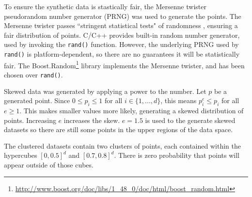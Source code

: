 To ensure the synthetic data is stastically fair, the Mersenne twister pseudorandom number generator (PRNG) was used to generate the points.  The Mersenne twister passes ``stringent statistical tests" of randomness \cite{mersenne-twister}, ensuring a fair distribution of points. C/C++ provides built-in random number generator, used by invoking the \texttt{rand()} function. However, the underlying PRNG used by \texttt{rand()} is platform-dependent, so there are no guarantees it will be statistically fair. The Boost.Random\footnote{\url{http://www.boost.org/doc/libs/1_48_0/doc/html/boost_random.html}} library implements the Mersenne twister, and has been chosen over \texttt{rand()}. 



Skewed data was generated by applying a power to the number. Let $p$ be a generated point. Since $0 \leq p_i \leq 1$ for all $i \in \lbrace 1, ..., d \rbrace$, this means $p_i^e \leq p_i$ for all $e \geq 1$. This makes smaller values more likely, generating a skewed distribution of points. Increasing $e$ increases the skew. $e = 1.5$ is used to the generate skewed datasets so there are still some points in the upper regions of the data space.

The clustered datasets contain two clusters of points, each contained within the hypercubes $[0,0.5]^d$ and $[0.7,0.8]^d$. There is zero probability that points will appear outside of those cubes.

